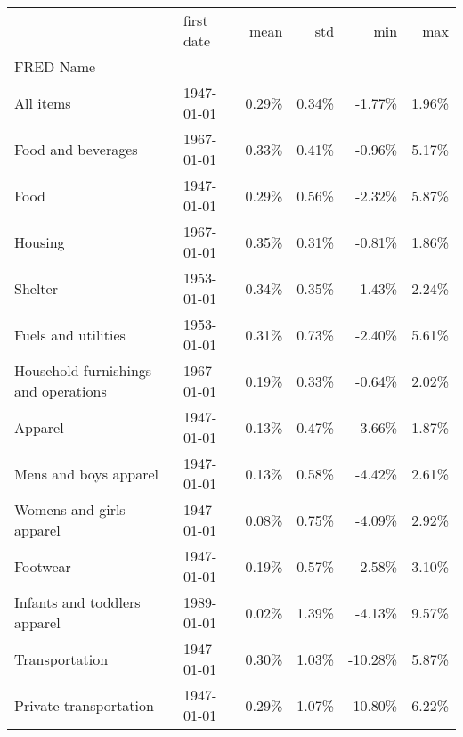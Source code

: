 \documentclass[12pt]{article}
\begin{document}
 \begin{adjustwidth}{-2cm}{}
\begin{table}
\begin{tabular}{llrrrr}
{} & {first date} & {mean} & {std} & {min} & {max} \\
{FRED Name} & {} & {} & {} & {} & {} \\
\hspace*{0ex}All items & 1947-01-01 & 0.29\% & 0.34\% & -1.77\% & 1.96\% \\
\hspace*{4ex}Food and beverages & 1967-01-01 & 0.33\% & 0.41\% & -0.96\% & 5.17\% \\
\hspace*{8ex}Food & 1947-01-01 & 0.29\% & 0.56\% & -2.32\% & 5.87\% \\
\hspace*{4ex}Housing & 1967-01-01 & 0.35\% & 0.31\% & -0.81\% & 1.86\% \\
\hspace*{8ex}Shelter & 1953-01-01 & 0.34\% & 0.35\% & -1.43\% & 2.24\% \\
\hspace*{8ex}Fuels and utilities & 1953-01-01 & 0.31\% & 0.73\% & -2.40\% & 5.61\% \\
\hspace*{8ex}Household furnishings and operations & 1967-01-01 & 0.19\% & 0.33\% & -0.64\% & 2.02\% \\
\hspace*{4ex}Apparel & 1947-01-01 & 0.13\% & 0.47\% & -3.66\% & 1.87\% \\
\hspace*{8ex}Mens and boys apparel & 1947-01-01 & 0.13\% & 0.58\% & -4.42\% & 2.61\% \\
\hspace*{8ex}Womens and girls apparel & 1947-01-01 & 0.08\% & 0.75\% & -4.09\% & 2.92\% \\
\hspace*{8ex}Footwear & 1947-01-01 & 0.19\% & 0.57\% & -2.58\% & 3.10\% \\
\hspace*{8ex}Infants and toddlers apparel & 1989-01-01 & 0.02\% & 1.39\% & -4.13\% & 9.57\% \\
\hspace*{4ex}Transportation & 1947-01-01 & 0.30\% & 1.03\% & -10.28\% & 5.87\% \\
\hspace*{8ex}Private transportation & 1947-01-01 & 0.29\% & 1.07\% & -10.80\% & 6.22\% \\

\end{tabular}
\end{table}
\end{adjustwidth}
\end{document}
